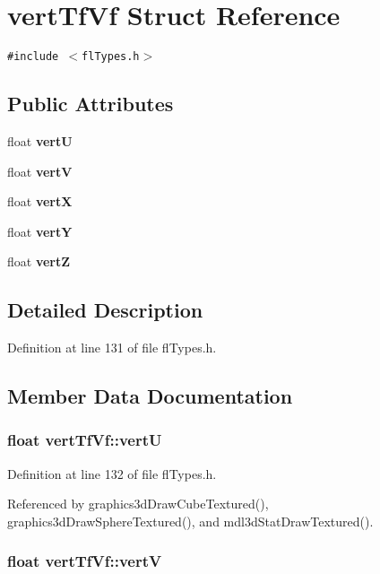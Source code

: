 \section{vert\-Tf\-Vf Struct Reference}
\label{structvertTfVf}
{\tt \#include $<$fl\-Types.h$>$}

\subsection*{Public Attributes}
\begin{CompactItemize}
\item 
float {\bf vert\-U}
\item 
float {\bf vert\-V}
\item 
float {\bf vert\-X}
\item 
float {\bf vert\-Y}
\item 
float {\bf vert\-Z}
\end{CompactItemize}


\subsection{Detailed Description}




Definition at line 131 of file fl\-Types.h.

\subsection{Member Data Documentation}
\subsubsection{\setlength{\rightskip}{0pt plus 5cm}float {\bf vert\-Tf\-Vf::vert\-U}}\label{structvertTfVf_12b2724e2e2dda32ded2b273ff2b6a7f}




Definition at line 132 of file fl\-Types.h.

Referenced by graphics3d\-Draw\-Cube\-Textured(), graphics3d\-Draw\-Sphere\-Textured(), and mdl3d\-Stat\-Draw\-Textured().
\subsubsection{\setlength{\rightskip}{0pt plus 5cm}float {\bf vert\-Tf\-Vf::vert\-V}}\label{structvertTfVf_25abd7a5e719992772527da489390dcd}




